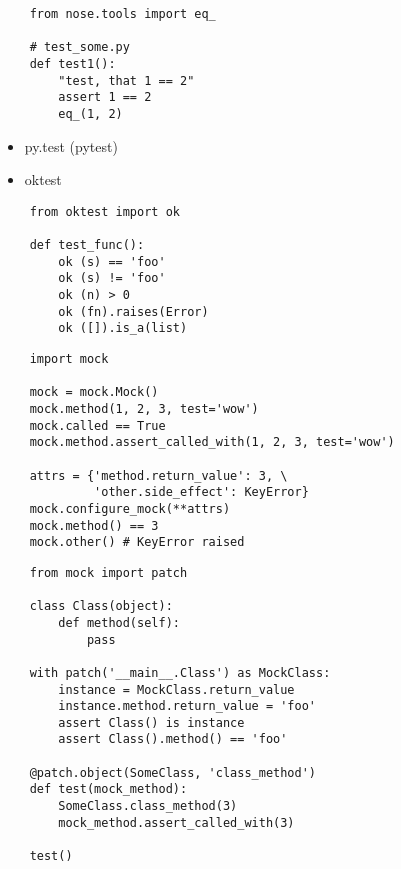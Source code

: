 \documentclass{article}
\begin{document}
{
\LARGE \vspace{15pt}
\begin{lstlisting}
	from nose.tools import eq_

	# test_some.py
	def test1():
		"test, that 1 == 2"
		assert 1 == 2
		eq_(1, 2)

\end{lstlisting}
}
\newpage

\begin{itemize}

\item py.test (pytest) 
\item oktest 

\end{itemize}

{
\LARGE \vspace{15pt}
\begin{lstlisting}
	from oktest import ok

	def test_func():
		ok (s) == 'foo'
		ok (s) != 'foo'
		ok (n) > 0     
		ok (fn).raises(Error)
		ok ([]).is_a(list)
\end{lstlisting}
}

\newpage

{
\LARGE \vspace{15pt}
\begin{lstlisting}
	import mock

	mock = mock.Mock()
	mock.method(1, 2, 3, test='wow')
	mock.called == True
	mock.method.assert_called_with(1, 2, 3, test='wow')
	
	attrs = {'method.return_value': 3, \
			 'other.side_effect': KeyError}
	mock.configure_mock(**attrs)
	mock.method() == 3
	mock.other() # KeyError raised
\end{lstlisting}
}

\newpage
\center{Юнит-тестирование. mock}
{
\LARGE \vspace{15pt}
\begin{lstlisting}
	from mock import patch

	class Class(object):
		def method(self):
			pass

	with patch('__main__.Class') as MockClass:
		instance = MockClass.return_value
		instance.method.return_value = 'foo'
		assert Class() is instance
		assert Class().method() == 'foo'

	@patch.object(SomeClass, 'class_method')
	def test(mock_method):
		SomeClass.class_method(3)
		mock_method.assert_called_with(3)
	
	test()
\end{lstlisting}
}
\end{document}
